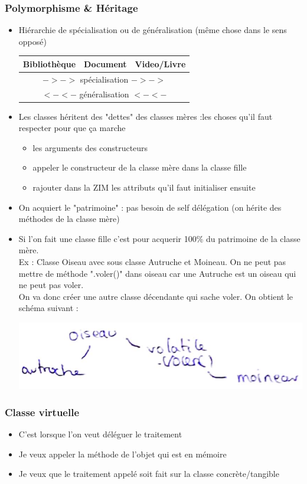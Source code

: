 \documentclass[12pt,a4paper]{article}
\begin{document}
\subsubsection{Polymorphisme \& Héritage}
\begin{itemize}
\item Hiérarchie de spécialisation ou de généralisation (même chose dans le sens opposé)
\begin{tabular}{|c|c|c|}
  \hline
  Bibliothèque & Document & Video/Livre \\ \hline
  \multicolumn{3}{|c|}{$-> ->$ spécialisation $-> ->$}\\\hline
  \multicolumn{3}{|c|}{$<- <-$ généralisation $<- <-$}\\\hline
\end{tabular}
\item Les classes héritent des "dettes" des classes mères :les choses qu'il faut respecter pour que ça marche
\begin{itemize}
\item les arguments des constructeurs
\item appeler le constructeur de la classe mère dans la classe fille
\item rajouter dans la ZIM les attributs qu'il faut initialiser ensuite
\end{itemize}
\item On acquiert le "patrimoine" : pas besoin de self délégation (on hérite des méthodes de la classe mère)
\item Si l'on fait une classe fille c'est pour acquerir 100\% du patrimoine de la classe mère.\\
Ex : Classe Oiseau avec sous classe Autruche et Moineau. On ne peut pas mettre de méthode ".voler()" dans oiseau car une Autruche est un oiseau qui ne peut pas voler.\\
On va donc créer une autre classe décendante qui sache voler. On obtient le schéma suivant :
\begin{center}
\includegraphics[scale=0.5]{sous-classe-oiseau}
\end{center}
\end{itemize}
\subsubsection{Classe virtuelle}
\begin{itemize}
\item C'est lorsque l'on veut déléguer le traitement
\item Je veux appeler la méthode de l'objet qui est en mémoire
\item Je veux que le traitement appelé soit fait sur la classe concrète/tangible
\end{itemize}
\end{document}
